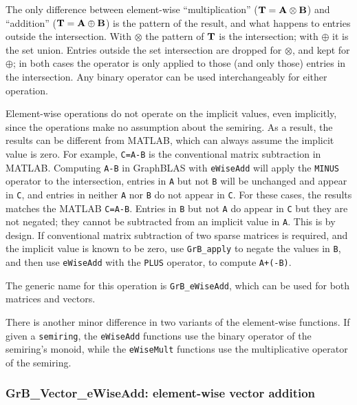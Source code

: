 \documentclass[12pt]{article}
\begin{document}
{The only difference between element-wise ``multiplication'' (${\bf T =A \otimes
B}$) and ``addition'' (${\bf T = A \oplus B}$) is the pattern of the result,
and what happens to entries outside the intersection.  With $\otimes$ the
pattern of ${\bf T}$ is the intersection; with $\oplus$ it is the set union.
Entries outside the set intersection are dropped for $\otimes$, and kept for
$\oplus$; in both cases the operator is only applied to those (and only those)
entries in the intersection.  Any binary operator can be used interchangeably
for either operation.

Element-wise operations do not operate on the implicit values, even implicitly,
since the operations make no assumption about the semiring.  As a result, the
results can be different from MATLAB, which can always assume the implicit
value is zero.  For example, \verb'C=A-B' is the conventional matrix
subtraction in MATLAB.  Computing \verb'A-B' in GraphBLAS with \verb'eWiseAdd'
will apply the \verb'MINUS' operator to the intersection, entries in \verb'A'
but not \verb'B' will be unchanged and appear in \verb'C', and entries in
neither \verb'A' nor \verb'B' do not appear in \verb'C'.  For these cases, the
results matches the MATLAB \verb'C=A-B'.  Entries in \verb'B' but not \verb'A'
do appear in \verb'C' but they are not negated; they cannot be subtracted from
an implicit value in \verb'A'.  This is by design.  If conventional matrix
subtraction of two sparse matrices is required, and the implicit value is known
to be zero, use \verb'GrB_apply' to negate the values in \verb'B', and then
use \verb'eWiseAdd' with the \verb'PLUS' operator, to compute \verb'A+(-B)'.

The generic name for this operation is \verb'GrB_eWiseAdd', which can be used
for both matrices and vectors.

There is another minor difference in two variants of the element-wise
functions.  If given a \verb'semiring', the \verb'eWiseAdd' functions use the
binary operator of the semiring's monoid, while the \verb'eWiseMult' functions
use the multiplicative operator of the semiring.

\subsubsection{{\sf GrB\_Vector\_eWiseAdd:} element-wise vector addition}
\label{eWiseAdd_vector}

}
\end{document}
